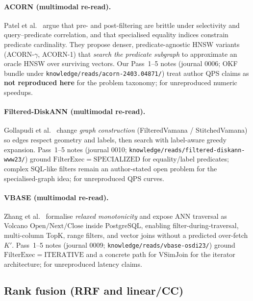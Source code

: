 \paragraph{ACORN (multimodal re-read).}
Patel et al.~\citep{patel2024acorn} argue that pre- and post-filtering are brittle under selectivity and query--predicate correlation, and that specialised equality indices constrain predicate cardinality.
They propose denser, predicate-agnostic HNSW variants (ACORN-$\gamma$, ACORN-1) that \emph{search the predicate subgraph} to approximate an oracle HNSW over surviving vectors.
Our Pass~1--5 notes (journal 0006; OKF bundle under \texttt{knowledge/reads/acorn-2403.04871/}) treat author QPS claims as \textbf{not reproduced here} \established{} for the problem taxonomy; \provisional{} for unreproduced numeric speedups.

\paragraph{Filtered-DiskANN (multimodal re-read).}
Gollapudi et al.~\citep{gollapudi2023filtered} change \emph{graph construction} (FilteredVamana / StitchedVamana) so edges respect geometry and labels, then search with label-aware greedy expansion.
Pass~1--5 notes (journal 0010; \texttt{knowledge/reads/filtered-diskann-www23/}) ground $\mathrm{FilterExec}=\mathrm{SPECIALIZED}$ for equality/label predicates; complex SQL-like filters remain an author-stated open problem \established{} for the specialised-graph idea; \provisional{} for unreproduced QPS curves.

\paragraph{VBASE (multimodal re-read).}
Zhang et al.~\citep{zhang2023vbase} formalise \emph{relaxed monotonicity} and expose ANN traversal as Volcano $\mathrm{Open}/\mathrm{Next}/\mathrm{Close}$ inside PostgreSQL, enabling filter-during-traversal, multi-column TopK, range filters, and vector joins without a predicted over-fetch $K'$.
Pass~1--5 notes (journal 0009; \texttt{knowledge/reads/vbase-osdi23/}) ground $\mathrm{FilterExec}=\mathrm{ITERATIVE}$ and a concrete path for $\mathrm{VSimJoin}$ \established{} for the iterator architecture; \provisional{} for unreproduced latency claims.

\subsection{Rank fusion (RRF and linear/CC)}
